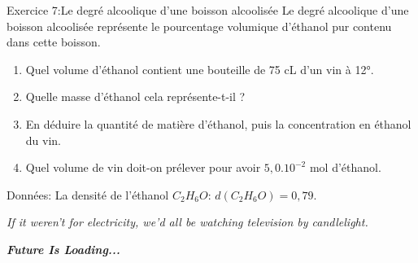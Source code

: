 \documentclass[12pt, french]{article}
\begin{document}
\begin{Box2}{Exercice 7:Le degré alcoolique d’une boisson alcoolisée }
	Le degré alcoolique d’une boisson alcoolisée représente le pourcentage volumique d’éthanol pur
contenu dans cette boisson.
\begin{enumerate}
\item Quel volume d’éthanol contient une bouteille de 75 cL d’un vin à 12°.
\item Quelle masse d’éthanol cela représente-t-il ?
\item En déduire la quantité de matière d’éthanol, puis la concentration en éthanol du vin.
\item Quel volume de vin doit-on prélever pour avoir $5,0.10^{-2}$ mol d’éthanol.
\end{enumerate}
Données: La densité de l’éthanol $C_2H_6O$: $d(C_2H_6O) = 0,79$.
\end{Box2}


\begin{center}
	\emph{If it weren't for electricity, we'd all be watching television by candlelight.}

	\emph{\textbf{Future Is Loading...}}

\end{center}
\end{document}
